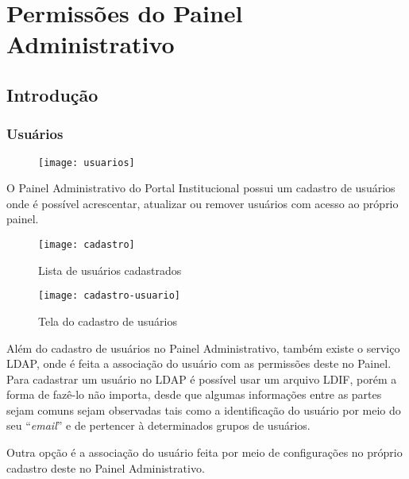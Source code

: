 \section{Permissões do Painel Administrativo}\label{RS0005:access}

\subsection{Introdução}

\subsubsection{Usuários}

\begin{figure}[!ht]
    \centering
    \texttt{[image: usuarios]}
\end{figure}

O Painel Administrativo do Portal Institucional possui um cadastro de usuários onde é possível acrescentar, atualizar ou remover usuários com acesso ao próprio painel.

\begin{figure}[!ht]
    \centering
    \texttt{[image: cadastro]}
    \caption{Lista de usuários cadastrados}\label{RS0005:fig:cadastro}
\end{figure}

\begin{figure}[!ht]
    \centering
    \texttt{[image: cadastro-usuario]}
    \caption{Tela do cadastro de usuários}\label{RS0005:fig:cadastro-usuario}
\end{figure}

Além do cadastro de usuários no Painel Administrativo, também existe o serviço \gls{LDAP}\cite{howes2003understanding}, onde é feita a associação do usuário com as permissões deste no Painel. Para cadastrar um usuário no \gls{LDAP} é possível usar um arquivo \gls{LDIF}\cite{good2000rfc2849}, porém a forma de fazê-lo não importa, desde que algumas informações entre as partes sejam comuns sejam observadas tais como a identificação do usuário por meio do seu ``\textit{email}'' e de pertencer à determinados grupos de usuários.

Outra opção é a associação do usuário feita por meio de configurações no próprio cadastro deste no Painel Administrativo.

\begin{code}
    \inputminted[xleftmargin=20pt,fontsize=\footnotesize,breaklines,breakanywhere,linenos=true,label=rules.json]{YAML}{../RS0005/anexos/admin.ldif}
    \caption{Exemplo de arquivo \gls{LDIF}}\label{RS0005:code:LDIF}
\end{code}

